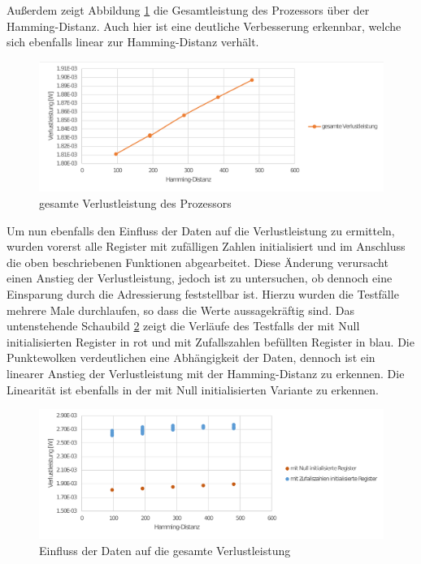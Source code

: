 Außerdem zeigt Abbildung \ref{fig:total_power_source_target} die Gesamtleistung des Prozessors über der Hamming-Distanz. Auch hier ist eine deutliche Verbesserung erkennbar, welche sich ebenfalls linear zur Hamming-Distanz verhält.

\begin{figure}[H]
	\centering
	\includegraphics[width=\textwidth]{fig/total_power_source_target.pdf}
	\caption{gesamte Verlustleistung des Prozessors}
	\label{fig:total_power_source_target}
\end{figure}

Um nun ebenfalls den Einfluss der Daten auf die Verlustleistung zu ermitteln, wurden vorerst alle Register mit zufälligen Zahlen initialisiert und im Anschluss die oben beschriebenen Funktionen abgearbeitet. Diese Änderung verursacht einen Anstieg der Verlustleistung, jedoch ist zu untersuchen, ob dennoch eine Einsparung durch die Adressierung feststellbar ist. Hierzu wurden die Testfälle mehrere Male durchlaufen, so dass die Werte aussagekräftig sind. Das untenstehende Schaubild \ref{fig:random_data_total_power} zeigt die Verläufe des Testfalls der mit Null initialisierten Register in rot und mit Zufallszahlen befüllten Register in blau. Die Punktewolken verdeutlichen eine Abhängigkeit der Daten, dennoch ist ein linearer Anstieg der Verlustleistung mit der Hamming-Distanz zu erkennen. Die Linearität ist ebenfalls in der mit Null initialisierten Variante zu erkennen.

\begin{figure}[H]
	\centering
	\includegraphics[width=\textwidth]{fig/random_data_total_power.pdf}
	\caption{Einfluss der Daten auf die gesamte Verlustleistung}
	\label{fig:random_data_total_power}
\end{figure}


